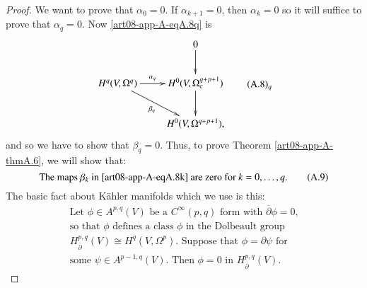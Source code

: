 \begin{proof}
We want to prove that $\alpha_{0}=0$. If $\alpha_{k+1}=0$, then $\alpha_{k}=0$ so it will suffice to prove that $\alpha_{q}=0$. Now \ref{art08-app-A-eqA.8q} is
\begin{equation*}
\vcenter{\xymatrix{
 & 0\ar[d]\\
H^{q}(V,\Omega^{q})\ar[dr]_-{\beta_{q}}\ar[r]^-{\alpha_{q}} & H^{0}(V,\Omega^{q+p+1}_{c})\ar[d]\\
 & H^{0}(V,\Omega^{q+p+1}),
}}\tag*{(A.8)$_{q}$}\label{art08-app-A-eqA.8q}
\end{equation*}
and so we have to show that $\beta_{q}=0$. Thus, to prove Theorem \ref{art08-app-A-thmA.6}, we will show that:
\setcounter{equation}{8}
\begin{equation*}
\text{The maps $\beta_{k}$ in \ref{art08-app-A-eqA.8k} are zero for } k=0,\ldots,q.\tag{A.9}\label{art08-app-A-eqA.9}
\end{equation*}
The basic fact about K\"ahler manifolds which we use is this:
\begin{equation*}
\begin{array}{l}
\text{Let $\phi\in A^{p,q}(V)$ be a $C^{\infty}(p,q)$ form with $\overline{\partial}\phi=0$,}\\
\text{so that $\phi$ defines a class $\phi$ in the Dolbeault group}\\
\text{$H^{p,q}_{\overline{\partial}}(V)\cong H^{q}(V,\Omega^{p})$. Suppose that $\phi=\partial\psi$ for}\\
\text{some $\psi\in A^{p-1,q}(V)$. Then $\phi=0$ in $H^{p,q}_{\overline{\partial}}(V)$.}
\end{array}\tag{A.10}\label{art08-app-A-eqA.10}
\end{equation*}
\end{proof}

